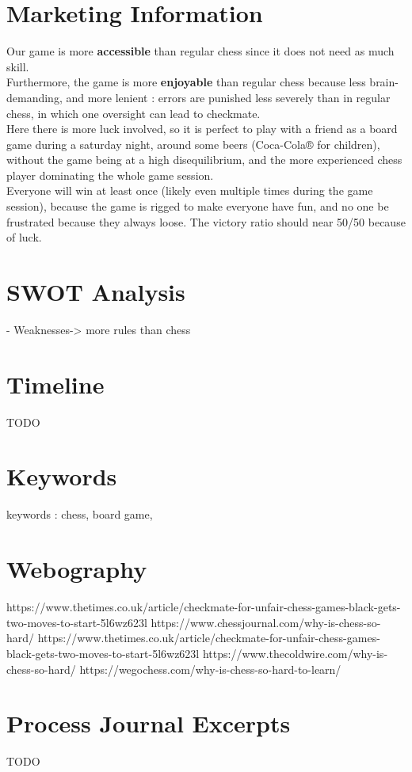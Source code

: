\documentclass[12pt]{article}
\begin{document}
    \section{Marketing Information}
        Our game is more \textbf{accessible} than regular chess since it does not need as much skill.
        \\Furthermore, the game is more \textbf{enjoyable} than regular chess because less brain-demanding, and more lenient : errors are punished less severely than in regular chess, in which one oversight can lead to checkmate.
        \\Here there is more luck involved, so it is perfect to play with a friend as a board game during a saturday night, around some beers (Coca-Cola® for children), without the game being at a high disequilibrium, and the more experienced chess player dominating the whole game session.
        \\Everyone will win at least once (likely even multiple times during the game session), because the game is rigged to make everyone have fun, and no one be frustrated because they always loose. The victory ratio should near 50/50 because of luck.

    
    \section{SWOT Analysis}
        
    - Weaknesses-> more rules than chess

    
    \section{Timeline}
        TODO
    
    \section{Keywords}
        keywords : chess, board game,
    
    \section{Webography}
        https://www.thetimes.co.uk/article/checkmate-for-unfair-chess-games-black-gets-two-moves-to-start-5l6wz623l
        https://www.chessjournal.com/why-is-chess-so-hard/
        https://www.thetimes.co.uk/article/checkmate-for-unfair-chess-games-black-gets-two-moves-to-start-5l6wz623l
        https://www.thecoldwire.com/why-is-chess-so-hard/
        https://wegochess.com/why-is-chess-so-hard-to-learn/

        
    \section{Process Journal Excerpts}
        TODO
    
\end{document}
